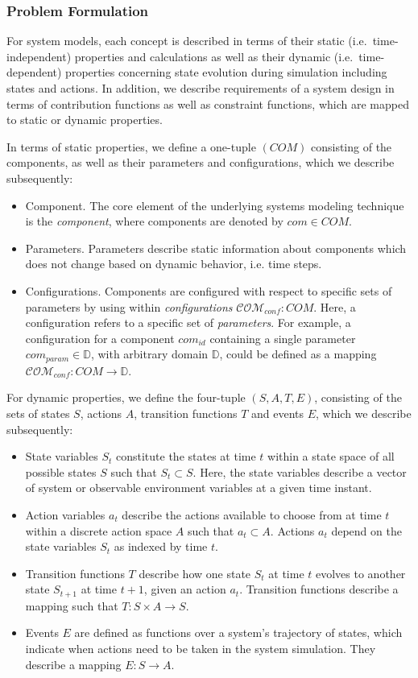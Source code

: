 \documentclass[a4paper,twoside]{article}
\begin{document}
	\subsubsection{Problem Formulation}
	For system models, each concept is described in terms of their static (i.e.\ time-independent) properties and calculations as well as their dynamic (i.e.\ time-dependent) properties concerning state evolution during simulation including states and actions. In addition, we describe requirements of a system design in terms of contribution functions as well as constraint functions, which are mapped to static or dynamic properties.
	
	In terms of static properties, we define a one-tuple $(COM)$ consisting of the components, as well as their parameters and configurations, which we describe subsequently:
	\begin{itemize}
		\item Component. The core element of the underlying systems modeling technique is the \textit{component}, where components are denoted by $com \in COM$. 
		\item Parameters. Parameters describe static information about components which does not change based on dynamic behavior, i.e. time steps.
		\item Configurations. Components are configured with respect to specific sets of parameters by using within \textit{configurations} $\mathcal{COM}_{conf}: COM$. Here, a configuration refers to a specific set of \textit{parameters}. For example, a configuration for a component $com_{id}$ containing a single parameter $com_{param} \in \mathbb{D}$, with arbitrary domain $\mathbb{D}$, could be defined as a mapping $\mathcal{COM}_{conf}: COM \rightarrow \mathbb{D}$.
		
		
	\end{itemize}
	
	
	For dynamic properties, we define the four-tuple $(S, A, T, E)$, consisting of the sets of states $S$, actions $A$, transition functions $T$ and events $E$, which we describe subsequently:	
	\begin{itemize}
		\item State variables $S_t$ constitute the states at time $t$ within a state space of all possible states $S$ such that $S_t \subset S$. Here, the state variables describe a vector of system or observable environment variables at a given time instant. 
		\item Action variables $a_t$ describe the actions available to choose from at time $t$ within a discrete action space $A$ such that $a_t \subset A$. Actions $a_t$ depend on the state variables $S_t$ as indexed by time $t$.
		\item Transition functions $T$ describe how one state $S_t$ at time $t$ evolves to another state $S_{t+1}$ at time $t+1$, given an action $a_t$. Transition functions describe a mapping such that $T : S \times A \to S$. 
		\item Events $E$ are defined as functions over a system's trajectory of states, which indicate when actions need to be taken in the system simulation. They describe a mapping $E : S \to A$. 
	\end{itemize}
	
\end{document}
